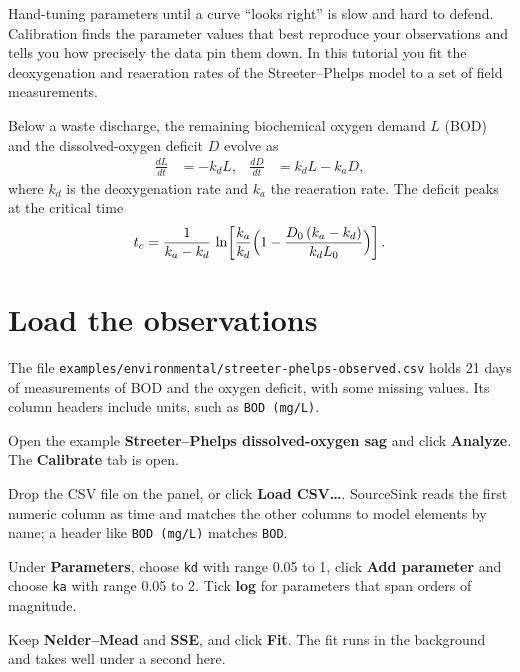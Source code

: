 \documentclass[11pt,oneside]{book}
\newcommand{\ui}[1]{\textsf{\textbf{#1}}}                       %
\newcommand{\el}[1]{\texttt{#1}}                                %
\begin{document}
Hand-tuning parameters until a curve ``looks right'' is slow and hard to
defend. Calibration finds the parameter values that best reproduce your
observations and tells you how precisely the data pin them down. In this
tutorial you fit the deoxygenation and reaeration rates of the Streeter--Phelps
model \cite{streeter1925} to a set of field measurements.

\begin{mathbox}
Below a waste discharge, the remaining biochemical oxygen demand $L$ (BOD) and
the dissolved-oxygen deficit $D$ evolve as
\begin{align}
  \frac{dL}{dt} &= -k_d L, &
  \frac{dD}{dt} &= k_d L - k_a D,
\end{align}
where $k_d$ is the deoxygenation rate and $k_a$ the reaeration rate. The
deficit peaks at the critical time
\begin{equation}
  t_c = \frac{1}{k_a - k_d}\,
  \ln\!\left[\frac{k_a}{k_d}\Bigl(1 - \frac{D_0\,(k_a - k_d)}{k_d L_0}\Bigr)\right].
\end{equation}
\end{mathbox}

\section{Load the observations}

The file \texttt{examples/environmental/streeter-phelps-observed.csv} holds
21 days of measurements of BOD and the oxygen deficit, with some missing
values. Its column headers include units, such as \texttt{BOD (mg/L)}.

\begin{tryit}
\begin{steps}
  \item Open the example \ui{Streeter--Phelps dissolved-oxygen sag} and click
  \ui{Analyze}. The \ui{Calibrate} tab is open.
  \item Drop the CSV file on the panel, or click \ui{Load CSV…}. SourceSink
  reads the first numeric column as time and matches the other columns to
  model elements by name; a header like \texttt{BOD (mg/L)} matches \el{BOD}.
  \item Under \ui{Parameters}, choose \el{kd} with range 0.05 to 1, click
  \ui{Add parameter} and choose \el{ka} with range 0.05 to 2. Tick \ui{log}
  for parameters that span orders of magnitude.
  \item Keep \ui{Nelder--Mead} and \ui{SSE}, and click \ui{Fit}. The fit runs
  in the background and takes well under a second here.
\end{steps}
\end{tryit}
\end{document}
